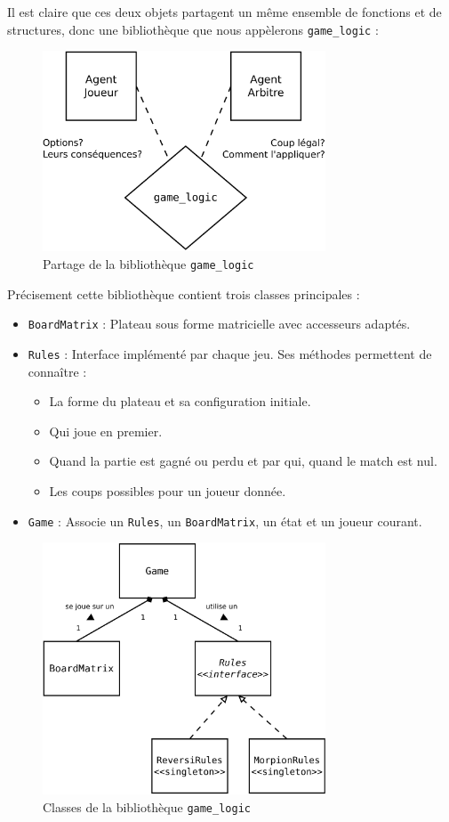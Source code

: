 Il est claire que ces deux objets partagent un même ensemble de fonctions et de structures, donc une bibliothèque que nous appèlerons \texttt{game\_logic}  :
\begin{figure}[H] 
\centering
\includegraphics[width=0.75\textwidth]{files/env/game_logic_shared} 
\caption{Partage de la bibliothèque \texttt{game\_logic}} 
\label{game_logic_shared}
\end{figure}
Précisement cette bibliothèque contient trois classes principales :
\begin{itemize}
\item \texttt{BoardMatrix} : Plateau sous forme matricielle avec accesseurs adaptés.
\item \texttt{Rules} : Interface implémenté par chaque jeu. Ses méthodes permettent de connaître :
\begin{itemize}
\item La forme du plateau et sa configuration initiale.
\item Qui joue en premier.
\item Quand la partie est gagné ou perdu et par qui, quand le match est nul.
\item Les coups possibles pour un joueur donnée.
\end{itemize}
\item \texttt{Game} : Associe un \texttt{Rules}, un \texttt{BoardMatrix}, un état et un joueur courant.
\end{itemize}
\begin{figure}[H] 
\centering
\includegraphics[width=0.75\textwidth]{files/env/game_logic} 
\caption{Classes de la bibliothèque \texttt{game\_logic}} 
\label{game_logic}
\end{figure}

